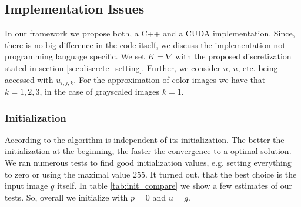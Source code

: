 
    \subsection{Implementation Issues} %
    \label{sub:implementation_issues}
        
        In our framework we propose both, a C++ and a CUDA implementation. Since, there is no big difference in the code itself, we discuss the implementation not programming language specific. We set $K = \nabla$ with the proposed discretization stated in section \ref{sec:discrete_setting}. Further, we consider $u$, $\bar{u}$, etc. being accessed with $u_{i,j,k}$. For the approximation of color images we have that $k = 1, 2, 3$, in the case of grayscaled images $k = 1$.\\

        \subsubsection{Initialization}
        \label{sub:initialization}

            According to \cite{Chambolle10afirst-order} the algorithm is independent of its initialization. The better the initialization at the beginning, the faster the convergence to a optimal solution. We ran numerous tests to find good initialization values, e.g. setting everything to zero or using the maximal value $255$. It turned out, that the best choice is the input image $g$ itself. In table \ref{tab:init_compare} we show a few estimates of our tests. So, overall we initialize with $p = 0$ and $u = g$.

